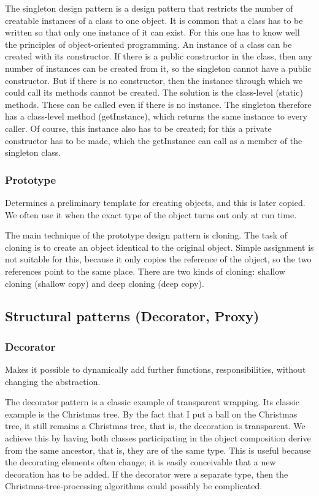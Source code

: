 \documentclass[margin=0px]{article}
\begin{document}
The singleton design pattern is a design pattern that restricts the number of creatable instances of a class to one object. It is common that a class has to be written so that only one instance of it can exist. For this one has to know well the principles of object-oriented programming. An instance of a class can be created with its constructor. If there is a public constructor in the class, then any number of instances can be created from it, so the singleton cannot have a public constructor. But if there is no constructor, then the instance through which we could call its methods cannot be created. The solution is the class-level (static) methods. These can be called even if there is no instance. The singleton therefore has a class-level method (getInstance), which returns the same instance to every caller. Of course, this instance also has to be created; for this a private constructor has to be made, which the getInstance can call as a member of the singleton class.

\subsubsection{Prototype}
Determines a preliminary template for creating objects, and this is later copied. We often use it when the exact type of the object turns out only at run time.

The main technique of the prototype design pattern is cloning. The task of cloning is to create an object identical to the original object. Simple assignment is not suitable for this, because it only copies the reference of the object, so the two references point to the same place. There are two kinds of cloning: shallow cloning (shallow copy) and deep cloning (deep copy).

\subsection{Structural patterns (Decorator, Proxy)}

\subsubsection{Decorator}
Makes it possible to dynamically add further functions, responsibilities, without changing the abstraction.

The decorator pattern is a classic example of transparent wrapping. Its classic example is the Christmas tree. By the fact that I put a ball on the Christmas tree, it still remains a Christmas tree, that is, the decoration is transparent. We achieve this by having both classes participating in the object composition derive from the same ancestor, that is, they are of the same type. This is useful because the decorating elements often change; it is easily conceivable that a new decoration has to be added. If the decorator were a separate type, then the Christmas-tree-processing algorithms could possibly be complicated.
\end{document}
